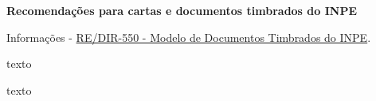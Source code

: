 \documentclass[a4paper, 11pt]{article}
\begin{document}
\textbf{Recomendações para cartas e documentos timbrados do INPE}

\vspace{1cm}



Informações - \href{http://intranet3.inpe.br/comunicacao_normativa/RE/RE550V02.pdf}{RE/DIR-550 - Modelo de Documentos Timbrados do INPE}.


\newpage

texto

\newpage


texto
\end{document}
